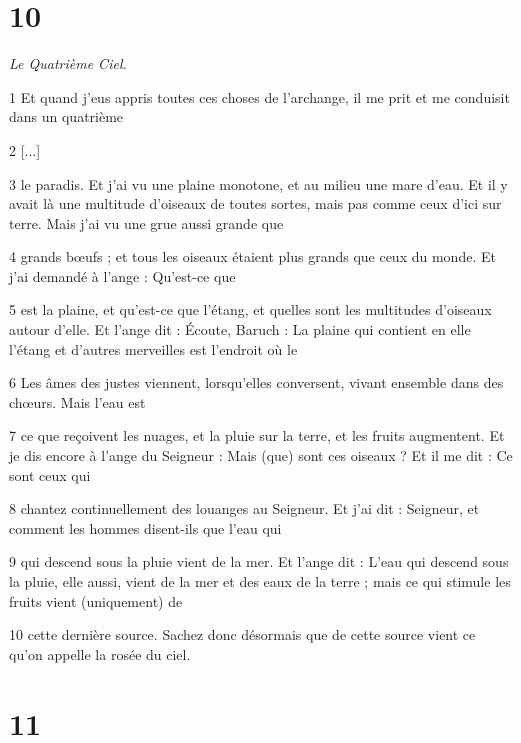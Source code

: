 \chapter{10}

\par \textit{Le Quatrième Ciel.}

\par 1 Et quand j'eus appris toutes ces choses de l'archange, il me prit et me conduisit dans un quatrième

\par 2 [...]

\par 3 le paradis. Et j'ai vu une plaine monotone, et au milieu une mare d'eau. Et il y avait là une multitude d’oiseaux de toutes sortes, mais pas comme ceux d’ici sur terre. Mais j'ai vu une grue aussi grande que

\par 4 grands bœufs ; et tous les oiseaux étaient plus grands que ceux du monde. Et j'ai demandé à l'ange : Qu'est-ce que

\par 5 est la plaine, et qu'est-ce que l'étang, et quelles sont les multitudes d'oiseaux autour d'elle. Et l'ange dit : Écoute, Baruch : La plaine qui contient en elle l'étang et d'autres merveilles est l'endroit où le

\par 6 Les âmes des justes viennent, lorsqu'elles conversent, vivant ensemble dans des chœurs. Mais l'eau est

\par 7 ce que reçoivent les nuages, et la pluie sur la terre, et les fruits augmentent. Et je dis encore à l'ange du Seigneur : Mais (que) sont ces oiseaux ? Et il me dit : Ce sont ceux qui

\par 8 chantez continuellement des louanges au Seigneur. Et j'ai dit : Seigneur, et comment les hommes disent-ils que l'eau qui

\par 9 qui descend sous la pluie vient de la mer. Et l'ange dit : L'eau qui descend sous la pluie, elle aussi, vient de la mer et des eaux de la terre ; mais ce qui stimule les fruits vient (uniquement) de

\par 10 cette dernière source. Sachez donc désormais que de cette source vient ce qu'on appelle la rosée du ciel.

\chapter{11}

